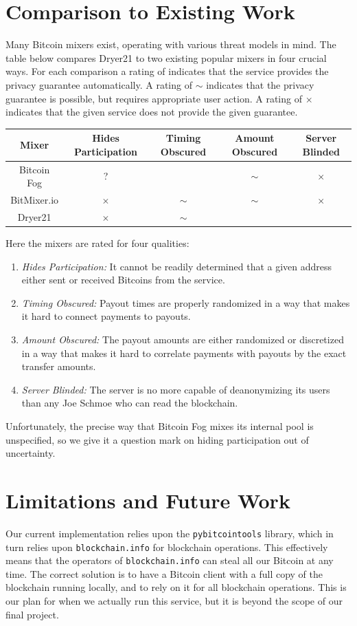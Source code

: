 \documentclass[12pt]{article}
\newcommand{\sw}[1]{\footnotesize{}#1}
\newcommand{\cmark}{\checkmark}
\newcommand{\xmark}{$\times$}
\begin{document}
\section{Comparison to Existing Work}
Many Bitcoin mixers exist, operating with various threat models in mind.
The table below compares Dryer21 to two existing popular mixers in four crucial ways.
For each comparison a rating of \cmark{} indicates that the service provides the privacy guarantee automatically.
A rating of $\sim$ indicates that the privacy guarantee is possible, but requires appropriate user action.
A rating of \xmark{} indicates that the given service does not provide the given guarantee.
\begin{center}
\begin{tabular}{c|c|c|c|c}
Mixer       & \sw{Hides Participation} & \sw{Timing Obscured} & \sw{Amount Obscured} & \sw{Server Blinded} \\\hline
Bitcoin Fog & ? & \cmark & $\sim$ & \xmark \\\hline
BitMixer.io & \xmark & $\sim$ & $\sim$ & \xmark \\\hline
Dryer21     & \xmark & $\sim$ & \cmark & \cmark
\end{tabular}
\end{center}
Here the mixers are rated for four qualities:
\begin{enumerate}
\item \emph{Hides Participation:} It cannot be readily determined that a given address either sent or received Bitcoins from the service.
\item \emph{Timing Obscured:} Payout times are properly randomized in a way that makes it hard to connect payments to payouts.
\item \emph{Amount Obscured:} The payout amounts are either randomized or discretized in a way that makes it hard to correlate payments with payouts by the exact transfer amounts.
\item \emph{Server Blinded:} The server is no more capable of deanonymizing its users than any Joe Schmoe who can read the blockchain.
\end{enumerate}
Unfortunately, the precise way that Bitcoin Fog mixes its internal pool is unspecified, so we give it a question mark on hiding participation out of uncertainty.

\section{Limitations and Future Work}
Our current implementation relies upon the \texttt{pybitcointools} library, which in turn relies upon \texttt{blockchain.info} for blockchain operations.
This effectively means that the operators of \texttt{blockchain.info} can steal all our Bitcoin at any time.
The correct solution is to have a Bitcoin client with a full copy of the blockchain running locally, and to rely on it for all blockchain operations.
This is our plan for when we actually run this service, but it is beyond the scope of our final project.
\end{document}
